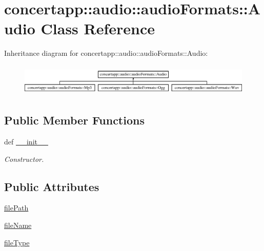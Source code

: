 \hypertarget{classconcertapp_1_1audio_1_1audio_formats_1_1_audio}{
\section{concertapp::audio::audioFormats::Audio Class Reference}
\label{classconcertapp_1_1audio_1_1audio_formats_1_1_audio}
}
Inheritance diagram for concertapp::audio::audioFormats::Audio:\begin{figure}[H]
\begin{center}
\leavevmode
\includegraphics[height=1.542700cm]{classconcertapp_1_1audio_1_1audio_formats_1_1_audio}
\end{center}
\end{figure}
\subsection*{Public Member Functions}
\begin{DoxyCompactItemize}
\item 
def \hyperlink{classconcertapp_1_1audio_1_1audio_formats_1_1_audio_a2f1bf3bd10949316ccbdcb06853344d4}{\_\-\_\-init\_\-\_\-}
\begin{DoxyCompactList}\small\item\em Constructor. \item\end{DoxyCompactList}\end{DoxyCompactItemize}
\subsection*{Public Attributes}
\begin{DoxyCompactItemize}
\item 
\hyperlink{classconcertapp_1_1audio_1_1audio_formats_1_1_audio_a8a45b79ad8dd16ff476f854bdae7b43d}{filePath}
\item 
\hyperlink{classconcertapp_1_1audio_1_1audio_formats_1_1_audio_a3aa482d3100456d2a143cf9a1bafc58e}{fileName}
\item 
\hyperlink{classconcertapp_1_1audio_1_1audio_formats_1_1_audio_a33e109f0465985c26e4b25f30a9895a2}{fileType}
\end{DoxyCompactItemize}


